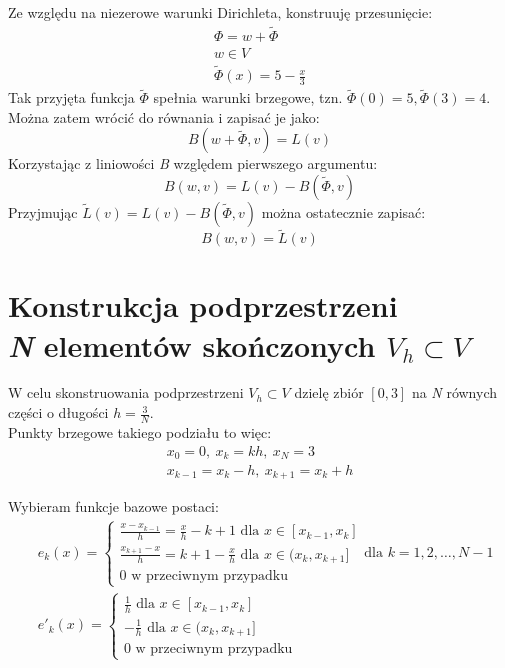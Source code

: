 \documentclass{article}
\begin{document}
Ze względu na niezerowe warunki Dirichleta, konstruuję przesunięcie:
\begin{gather*}
    \Phi = w + \tilde{\Phi}\\
    w \in V\\
    \tilde{\Phi}(x) = 5 - \frac{x}{3}
\end{gather*}
Tak przyjęta funkcja \(\tilde{\Phi}\) spełnia warunki brzegowe, tzn. \(\tilde{\Phi}(0) = 5, \tilde{\Phi}(3) = 4\).\\
Można zatem wrócić do równania i zapisać je jako:
\[B(w + \tilde{\Phi}, v) = L(v)\]
Korzystając z liniowości \textit{B} względem pierwszego argumentu:
\[B(w, v) = L(v) - B(\tilde{\Phi}, v)\]
Przyjmując \(\tilde{L}(v) = L(v) - B(\tilde{\Phi}, v)\) można ostatecznie zapisać:
\[B(w, v) = \tilde{L}(v)\]

\section{Konstrukcja podprzestrzeni\\\textit{N} elementów skończonych \(V_h \subset V\)}

W celu skonstruowania podprzestrzeni \(V_h \subset V\) dzielę zbiór \([0, 3]\) na \textit{N} równych części o długości \(h = \frac{3}{N}\).\\
Punkty brzegowe takiego podziału to więc:
\begin{gather*}
    x_0 = 0,\ x_k = kh,\ x_N = 3\\
    x_{k-1} = x_k - h,\ x_{k+1} = x_k + h
\end{gather*}

\noindent
Wybieram funkcje bazowe postaci:
\begin{align*}
    &e_k(x) =
    \begin{cases}
        \frac{x - x_{k-1}}{h} = \frac{x}{h} - k + 1 \text{ dla } x \in [x_{k-1}, x_k]\\
        \frac{x_{k+1} - x}{h} = k + 1 - \frac{x}{h} \text{ dla } x \in (x_k, x_{k+1}]\\
        0 \text{ w przeciwnym przypadku}
    \end{cases} \text{dla } k = 1, 2, \ldots, N-1\\
    &e'_k(x) =
    \begin{cases}
        \frac{1}{h} \text{ dla } x \in [x_{k-1}, x_k]\\
        -\frac{1}{h} \text{ dla } x \in (x_k, x_{k+1}]\\
        0 \text{ w przeciwnym przypadku}
    \end{cases}
\end{align*}
\end{document}
